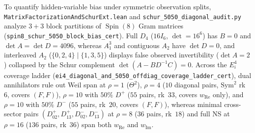 \documentclass[11pt,a4paper]{article}
\begin{document}
To quantify hidden-variable bias under symmetric observation splits, \texttt{Matrix\allowbreak{}Factorization\allowbreak{}And\allowbreak{}Schur\allowbreak{}Ext.lean} and \texttt{schur\_\allowbreak{}5050\_\allowbreak{}diagonal\_\allowbreak{}audit.py} analyze $3{+}3$ block partitions of $\operatorname{Spin}(8)$ Gram matrices (\texttt{spin8\_\allowbreak{}schur\_\allowbreak{}5050\_\allowbreak{}block\_\allowbreak{}bias\_\allowbreak{}cert}). Full $D_4$ ($16 I_6$, $\det = 16^6$) has $B = 0$ and $\det A = \det D = 4096$, whereas $A_1^3$ and contiguous $A_2$ have $\det D = 0$, and interleaved $A_2$ ($\{0,2,4\}\mid\{1,3,5\}$) displays false observed invertibility ($\det A = 2$) collapsed by the Schur complement $\det(A - B D^{-1} C) = 0$. Across the $E_i^4$ coverage ladder (\texttt{ei4\_\allowbreak{}diagonal\_\allowbreak{}and\_\allowbreak{}5050\_\allowbreak{}offdiag\_\allowbreak{}coverage\_\allowbreak{}ladder\_\allowbreak{}cert}), dual annihilators rule out Weil span at $\rho=1$ ($\Theta^2$), $\rho=4$ ($10$ diagonal pairs, $\mathrm{Sym}^2$ rk~$6$, covers $(F,F)$), $\rho=10$ with $50\%$ $D^+$ ($55$ pairs, rk~$33$, covers $w_{\mathrm{Re}}$ only), and $\rho=10$ with $50\%$ $D^-$ ($55$ pairs, rk~$20$, covers $(F,F)$), whereas minimal cross-sector pairs $(D^+_{02},\allowbreak D^+_{13},\allowbreak D^-_{02},\allowbreak D^-_{13})$ at $\rho=8$ ($36$ pairs, rk~$18$) and full NS at $\rho=16$ ($136$ pairs, rk~$36$) span both $w_{\mathrm{Re}}$ and $w_{\mathrm{Im}}$.
\end{document}
